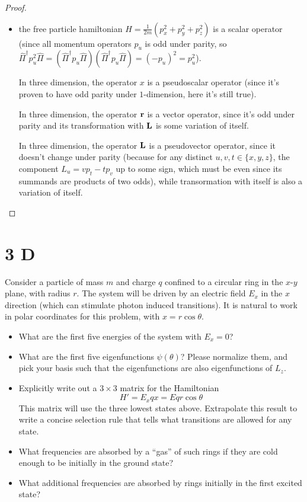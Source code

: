 \documentclass{article}
\begin{document}
\begin{proof}
\begin{itemize}
        \hfil

        \item[(d)] the free particle hamiltonian $H = \frac{1}{2m}(p_x^2+p_y^2+p_z^2)$ is a scalar operator (since all momentum operators $p_u$ is odd under parity, so $\hat{\Pi}^\dagger p_u^2 \hat{\Pi} =(\hat{\Pi}^\dagger p_u \hat{\Pi})(\hat{\Pi}^\dagger p_u \hat{\Pi}) = (-p_u)^2 = p_u^2$).
        
        In three dimension, the operator $x$ is a pseudoscalar operator (since it's proven to have odd parity under $1$-dimension, here it's still true).

        In three dimension, the operator $\mathbf{r}$ is a vector operator, since it's odd under parity and its transformation with $\mathbf{L}$ is some variation of itself.

        In three dimension, the operator $\mathbf{L}$ is a pseudovector operator, since it doesn't change under parity (because for any distinct $u,v,t \in \{x,y,z\}$, the component $L_u = v p_t - t p_v$ up to some sign, which must be even since its summands are products of two odds), while transormation with itself is also a variation of itself.
    \end{itemize}
\end{proof}

\newpage

\section*{3 D}
\begin{ques}\label{q3}
Consider a particle of mass $m$ and charge $q$ confined to a circular ring in the $x$-$y$ plane, with radius $r$. The system will be driven by an electric field $E_x$ in the $x$ direction (which can stimulate photon induced transitions). It is natural to work in polar coordinates for this problem, with $x=r\cos\theta$.

\begin{itemize}
\item[(a)] What are the first five energies of the system with $E_x=0$?

\item[(b)] What are the first five eigenfunctions $\psi(\theta)$? Please normalize them, and pick your basis such that the eigenfunctions are also eigenfunctions of $L_z$.

\item[(c)] Explicitly write out a $3\times3$ matrix for the Hamiltonian
\[
H' = E_x q x = E q r \cos\theta
\]
This matrix will use the three lowest states above. Extrapolate this result to write a concise selection rule that tells what transitions are allowed for any state.

\item[(d)] What frequencies are absorbed by a “gas” of such rings if they are cold enough to be initially in the ground state?

\item[(e)] What additional frequencies are absorbed by rings initially in the first excited state?
\end{itemize}
\end{ques}
\end{document}
